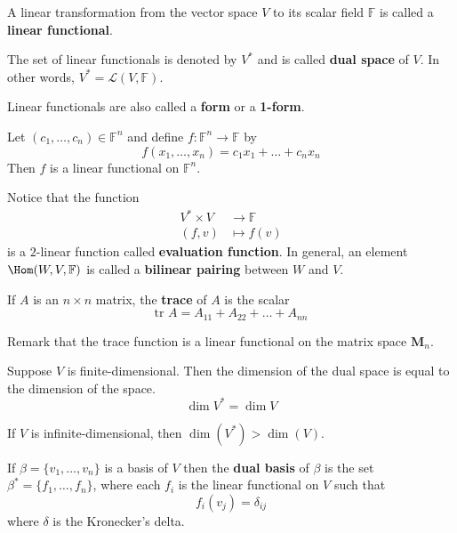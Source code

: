\begin{definition}
	A linear transformation from the vector space $V$ to its scalar field $\mathbb{F}$ is called a \textbf{linear functional}.
	
	The set of linear functionals is denoted by $V^\ast$ and is called \textbf{dual space} of $V$. In other words, $V^\ast = \mathcal{L}(V, \mathbb{F})$.
\end{definition}

Linear functionals are also called a \textbf{form} or a \textbf{1-form}.

\begin{example}
	Let $(c_1, \ldots, c_n) \in \mathbb{F}^n$ and define $f : \mathbb{F}^n \longrightarrow \mathbb{F}$ by 
	\[
		f(x_1, \ldots, x_n) = c_1 x_1 + \ldots + c_n x_n
	\]
	Then $f$ is a linear functional on $\mathbb{F}^n$.
\end{example}

\begin{example}
Notice that the function 
\begin{equation*}
  \begin{aligned}
    V^\ast \times V &\longrightarrow \mathbb{F} \\
    (f,v) &\longmapsto f(v)
  \end{aligned}
\end{equation*}
is a $2$-linear function called \textbf{evaluation function}. In general, an element $\Hom(W,V, \mathbb{F})$ is called a \textbf{bilinear pairing} between $W$ and $V$.
\end{example}

\begin{example}[Trace]
	If $A$ is an $n \times n$ matrix, the \textbf{trace} of $A$ is the scalar
	\[
		\text{tr } A = A_{11} + A_{22} + \ldots + A_{nn}
	\]
	
	Remark that the trace function is a linear functional on the matrix space $\textbf{M}_n$.
\end{example}

\begin{remark}
	Suppose $V$ is finite-dimensional. Then the dimension of the dual space is equal to the dimension of the space.
	\[
		\dim V^\ast = \dim V
	\]

	If $V$ is infinite-dimensional, then $\dim (V^\ast) > \dim (V)$.
\end{remark}

\begin{definition}
	If $\beta = \{ v_1, \ldots, v_n \}$ is a basis of $V$ then the \textbf{dual basis} of $\beta$ is the set $\beta^\ast = \{ f_1, \ldots, f_n \}$, where each $f_i$ is the linear functional on $V$ such that 
	\[
		f_i(v_j) = \delta_{ij}
	\]
	where $\delta$ is the Kronecker's delta.
\end{definition}

